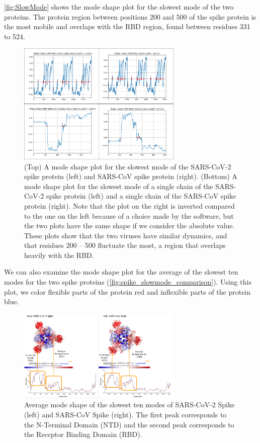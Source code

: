 \autoref{fig:SlowMode} shows the mode shape plot for the slowest mode of the two proteins. The protein region between positions 200 and 500 of the spike protein is the most mobile and overlaps with the RBD region, found between residues 331 to 524.

\begin{figure}[h]
	\centering
	\mySfFamily
	\includegraphics[width = 0.7\textwidth]{../images/SlowMode.png}
	\caption{(Top) A mode shape plot for the slowest mode of the SARS-CoV-2 spike protein (left) and SARS-CoV spike protein (right). (Bottom) A mode shape plot for the slowest mode of a single chain of the SARS-CoV-2 spike protein (left) and a single chain of the SARS-CoV spike protein (right). Note that the plot on the right is inverted compared to the one on the left because of a choice made by the software, but the two plots have the same shape if we consider the absolute value. These plots show that the two viruses have similar dynamics, and that residues 200 – 500 fluctuate the most, a region that overlaps heavily with the RBD.}
	\label{fig:SlowMode}
\end{figure}

We can also examine the mode shape plot for the average of the slowest ten modes for the two spike proteins (\autoref{fig:spike_slowmode_comparison}). Using this plot, we color flexible parts of the protein red and inflexible parts of the protein blue.

\begin{figure}[h]
	\centering
	\mySfFamily
	\includegraphics[width = 0.7\textwidth]{../images/spike_slowmode_comparison.png}
	\caption{Average mode shape of the slowest ten modes of SARS-CoV-2 Spike (left) and SARS-CoV Spike (right). The first peak corresponds to the N-Terminal Domain (NTD) and the second peak corresponds to the Receptor Binding Domain (RBD).}
	\label{fig:spike_slowmode_comparison}
\end{figure}

